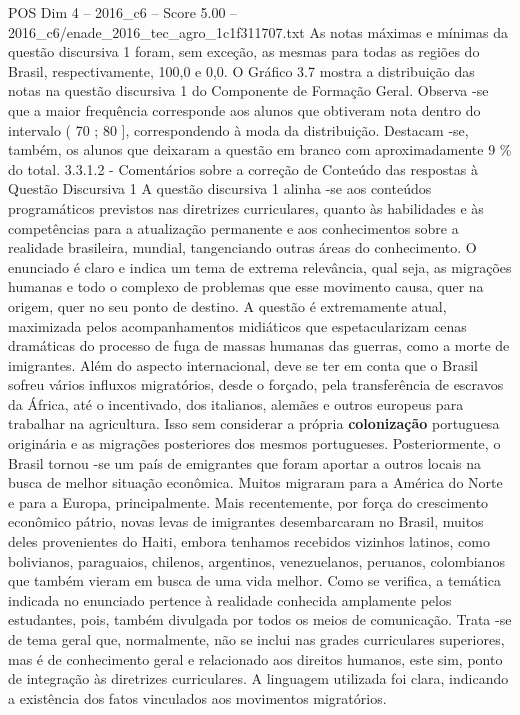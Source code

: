 \begin{textsample}{POS Dim 4 – 2016\_c6 – Score 5.00 – 2016\_c6/enade\_2016\_tec\_agro\_1c1f311707.txt}
As notas máximas e mínimas da questão discursiva 1 foram, sem exceção, as mesmas para todas as regiões do Brasil, respectivamente, 100,0 e 0,0.
O Gráfico 3.7 mostra a distribuição das notas na questão discursiva 1 do Componente de Formação Geral.
Observa -se que a maior frequência corresponde aos alunos que obtiveram nota dentro do intervalo ( 70 ; 80 ], correspondendo à moda da distribuição.
Destacam -se, também, os alunos que deixaram a questão em branco com aproximadamente 9 \% do total. 3.3.1.2 - Comentários sobre a correção de Conteúdo das respostas à Questão Discursiva 1 A questão discursiva 1 alinha -se aos conteúdos programáticos previstos nas diretrizes curriculares, quanto às habilidades e às competências para a atualização permanente e aos conhecimentos sobre a realidade brasileira, mundial, tangenciando outras áreas do conhecimento.
O enunciado é claro e indica um tema de extrema relevância, qual seja, as migrações humanas e todo o complexo de problemas que esse movimento causa, quer na origem, quer no seu ponto de destino.
A questão é extremamente atual, maximizada pelos acompanhamentos midiáticos que espetacularizam cenas dramáticas do processo de fuga de massas humanas das guerras, como a morte de imigrantes.
Além do aspecto internacional, deve se ter em conta que o Brasil sofreu vários influxos migratórios, desde o forçado, pela transferência de escravos da África, até o incentivado, dos italianos, alemães e outros europeus para trabalhar na agricultura.
Isso sem considerar a própria \textbf{colonização} portuguesa originária e as migrações posteriores dos mesmos portugueses.
Posteriormente, o Brasil tornou -se um país de emigrantes que foram aportar a outros locais na busca de melhor situação econômica.
Muitos migraram para a América do Norte e para a Europa, principalmente.
Mais recentemente, por força do crescimento econômico pátrio, novas levas de imigrantes desembarcaram no Brasil, muitos deles provenientes do Haiti, embora tenhamos recebidos vizinhos latinos, como bolivianos, paraguaios, chilenos, argentinos, venezuelanos, peruanos, colombianos que também vieram em busca de uma vida melhor.
Como se verifica, a temática indicada no enunciado pertence à realidade conhecida amplamente pelos estudantes, pois, também divulgada por todos os meios de comunicação.
Trata -se de tema geral que, normalmente, não se inclui nas grades curriculares superiores, mas é de conhecimento geral e relacionado aos direitos humanos, este sim, ponto de integração às diretrizes curriculares.
A linguagem utilizada foi clara, indicando a existência dos fatos vinculados aos movimentos migratórios.

\end{textsample}
